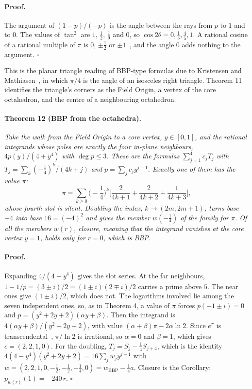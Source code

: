 \documentclass[twocolumn]{iopjournal}
\begin{document}
\paragraph{Proof.} The argument of $(1 - p)/(-p)$ is the angle between
the rays from $p$ to $1$ and to $0$. The values of $\tan^2$ are $1$,
$\tfrac12$, $\tfrac19$ and $0$, so $\cos 2\theta = 0, \tfrac13,
\tfrac45, 1$. A rational cosine of a rational multiple of $\pi$ is
$0$, $\pm\tfrac12$ or $\pm1$~\cite{Niven1956}, and the angle $0$ adds
nothing to the argument. \hfill $\square$

\medskip
\noindent
This is the planar triangle reading of BBP-type formulas due to
Kristensen and Mathiasen~\cite{Kristensen2022}, in which $\pi/4$ is
the angle of an isosceles right triangle. Theorem 11 identifies the
triangle's corners as the Field Origin, a vertex of the core
octahedron, and the centre of a neighbouring octahedron.

\paragraph{Theorem 12 (BBP from the octahedra).} \textit{Take the walk
from the Field Origin to a core vertex, $y \in [0,1]$, and the rational
integrands whose poles are exactly the four in-plane neighbours,
$4p(y)/(4 + y^4)$ with $\deg p \le 3$. These are the formulas
$\sum_{j=1}^{4} c_j T_j$ with $T_j = \sum_k (-\tfrac14)^k/(4k+j)$ and
$p = \sum_j c_j y^{j-1}$. Exactly one of them has the value $\pi$:}
\begin{equation}
  \pi = \sum_{k\ge0}\Big(-\frac14\Big)^k\Big[\frac{2}{4k+1} +
  \frac{2}{4k+2} + \frac{1}{4k+3}\Big],
  \label{eq:octa}
\end{equation}
\textit{whose fourth slot is silent. Doubling the index,
$k \to (2m, 2m+1)$, turns base $-4$ into base $16 = (-4)^2$ and
gives the member $w(-\tfrac14)$ of the family for $\pi$. Of all the
members $w(r)$, closure, meaning that the integrand vanishes at the
core vertex $y = 1$, holds only for $r = 0$, which is BBP.}

\paragraph{Proof.} Expanding $4/(4 + y^4)$ gives the slot series. At
the far neighbours, $1 - 1/p = (3 \pm i)/2 = (1 \pm i)(2 \mp i)/2$
carries a prime above $5$. The near ones give $(1 \pm i)/2$, which does
not. The logarithms involved lie among the seven independent ones, so,
as in Theorem 4, a value of $\pi$ forces $p(-1 \pm i) = 0$ and
$p = (y^2 + 2y + 2)(\alpha y + \beta)$. Then the integrand is
$4(\alpha y + \beta)/(y^2 - 2y + 2)$, with value
$(\alpha + \beta)\pi - 2\alpha\ln2$. Since $e^\pi$ is
transcendental~\cite{Gelfond1934}, $\pi/\ln 2$ is irrational, so
$\alpha = 0$ and $\beta = 1$, which gives $c = (2,2,1,0)$. For the
doubling, $T_j = S_j - \tfrac14 S_{j+4}$, which is the identity
$4(4 - y^4)(y^2 + 2y + 2) = 16\sum_j w_j y^{j-1}$ with
$w = (2, 2, 1, 0, -\tfrac12, -\tfrac12, -\tfrac14, 0) = w_{\mathrm{BBP}}
- \tfrac14 a$. Closure is the Corollary: $p_{w(r)}(1) = -240\,r$.
\hfill $\square$
\end{document}
